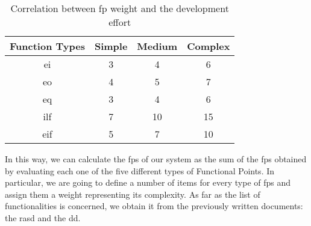 \begin{table}[htbp]
\begin{center}
\begin{tabular}[t]{cccc}

\hline
\textbf{Function Types} & \textbf{Simple} & \textbf{Medium} & \textbf{Complex}\\
\hline
\acs{ei} & 3 &  4 & 6\\
\hline
\acs{eo} & 4 &  5 & 7\\
\hline
\acs{eq} & 3 &  4 & 6\\
\hline
\acs{ilf} & 7 &  10 & 15\\
\hline
\acs{eif} & 5 &  7 & 10\\
\hline

\end{tabular}
\caption{Correlation between \acs{fp} weight and the development effort}
\end{center}
\end{table}

In this way, we can calculate the \acs{fp}s of our system as the sum of the \acs{fp}s obtained by evaluating each one of the five different types of Functional Points. In particular, we are going to define a number of items for every type of \acs{fp}s and assign them a weight representing its complexity.
As far as the list of functionalities is concerned, we obtain it from the previously written documents: the \acl{rasd} and the \acl{dd}.

